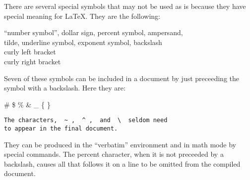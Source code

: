 \documentclass{article}
\begin{document}
There are several special symbols that may not be used as is 
because they have special meaning for LaTeX.  They are the 
following: 
 \begin{center}      
    ``number symbol'', dollar sign, percent symbol, ampersand, \\ 
      tilde,   underline symbol,  exponent symbol,  backslash  \\
      curly left bracket \\
      curly right bracket
 \end{center}
Seven of these symbols can be included in a document by just 
preceeding the symbol with a backslash.  Here they are: 
 \begin{center}
       \# \$ \% \& \_ \{ \}
 \end{center}
 \begin{verbatim} 
The characters,  ~ ,  ^ ,  and  \  seldom need 
to appear in the final document.
 \end{verbatim} 
They can be produced in the ``verbatim'' environment and in math 
mode by special commands.  The percent character, when it is not 
preceeded by a backslash, causes all that 
follows it on a line to be omitted from the compiled document. 
\ClearShipoutPicture
\end{document}
